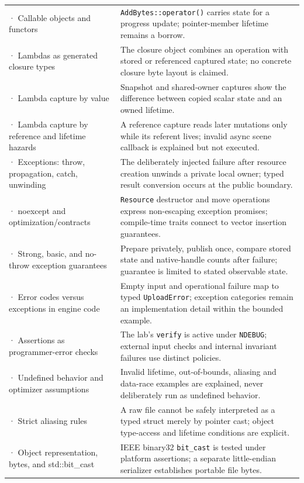 {\begin{longtable}[]{@{}
  >{\raggedright\arraybackslash}p{}
  >{\raggedright\arraybackslash}p{}@{}}
187 · Callable objects and functors & \texttt{AddBytes::operator()} carries state for a progress update; pointer-member lifetime remains a borrow. \\
188 · Lambdas as generated closure types & The closure object combines an operation with stored or referenced captured state; no concrete closure byte layout is claimed. \\
189 · Lambda capture by value & Snapshot and shared-owner captures show the difference between copied scalar state and an owned lifetime. \\
190 · Lambda capture by reference and lifetime hazards & A reference capture reads later mutations only while its referent lives; invalid async scene callback is explained but not executed. \\
191 · Exceptions: throw, propagation, catch, unwinding & The deliberately injected failure after resource creation unwinds a private local owner; typed result conversion occurs at the public boundary. \\
192 · noexcept and optimization/contracts & \texttt{Resource} destructor and move operations express non-escaping exception promises; compile-time traits connect to vector insertion guarantees. \\
193 · Strong, basic, and no-throw exception guarantees & Prepare privately, publish once, compare stored state and native-handle counts after failure; guarantee is limited to stated observable state. \\
194 · Error codes versus exceptions in engine code & Empty input and operational failure map to typed \texttt{UploadError}; exception categories remain an implementation detail within the bounded example. \\
195 · Assertions as programmer-error checks & The lab's \texttt{verify} is active under \texttt{NDEBUG}; external input checks and internal invariant failures use distinct policies. \\
196 · Undefined behavior and optimizer assumptions & Invalid lifetime, out-of-bounds, aliasing and data-race examples are explained, never deliberately run as undefined behavior. \\
197 · Strict aliasing rules & A raw file cannot be safely interpreted as a typed struct merely by pointer cast; object type-access and lifetime conditions are explicit. \\
198 · Object representation, bytes, and std::bit\_cast & IEEE binary32 \texttt{bit\_cast} is tested under platform assertions; a separate little-endian serializer establishes portable file bytes. \\

\end{longtable}}

